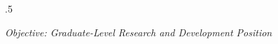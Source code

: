\documentclass{res}
\begin{document}
 
\thispagestyle{empty} %
\vspace{0.3in}
\address{
{\tt hyogi@vt.edu}, (540) 391-0202 \\
Dept. of Computer Science, Virginia Tech\\
2202 Kraft Drive, Blacksburg, VA 24060\\
}


\begin{resume}
\vspace{0.1in}
\moveleft.5\sectionwidth\centerline{
\it{Objective: Graduate-Level Research and Development Position}}

 
 
 






 
\end{resume}
\end{document}
